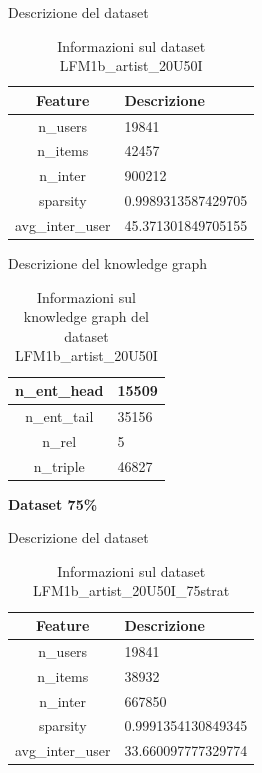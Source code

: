 \noindent Descrizione del dataset
\begin{table}[H]
    \centering
    \footnotesize
    \begin{tabularx}{\textwidth}{|c|X|}
        \hline
        \textbf{Feature} & \textbf{Descrizione} \\
        \hline
        n\_users & 19841 \\
        \hline
        n\_items & 42457 \\
        \hline
        n\_inter & 900212 \\
        \hline
        sparsity & 0.9989313587429705 \\
        \hline
        avg\_inter\_user & 45.371301849705155 \\
        \hline
    \end{tabularx}
    \caption{Informazioni sul dataset LFM1b\_artist\_20U50I}
    \label{tab:dataset_info}
\end{table}


\noindent Descrizione del knowledge graph
\begin{table}[H]
    \centering
    \footnotesize
    \begin{tabularx}{\textwidth}{|c|X|}
        \hline
        n\_ent\_head & 15509 \\
        \hline
        n\_ent\_tail & 35156 \\
        \hline
        n\_rel & 5 \\
        \hline
        n\_triple & 46827 \\
        \hline
    \end{tabularx}
    \caption{Informazioni sul knowledge graph del dataset LFM1b\_artist\_20U50I}
    \label{tab:dataset_info}
\end{table}

\noindent\textbf{Dataset 75\%}

\noindent Descrizione del dataset
\begin{table}[H]
    \centering
    \footnotesize
    \begin{tabularx}{\textwidth}{|c|X|}
        \hline
        \textbf{Feature} & \textbf{Descrizione} \\
        \hline
        n\_users & 19841 \\
        \hline
        n\_items & 38932 \\
        \hline
        n\_inter & 667850 \\
        \hline
        sparsity & 0.9991354130849345 \\
        \hline
        avg\_inter\_user & 33.660097777329774 \\
        \hline
    \end{tabularx}
    \caption{Informazioni sul dataset LFM1b\_artist\_20U50I\_75strat}
    \label{tab:dataset_info}
\end{table}


